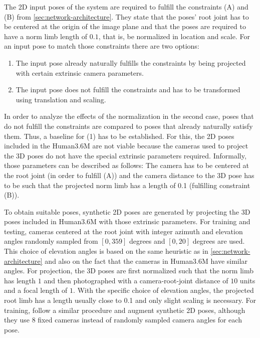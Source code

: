 The 2D input poses of the system are required to fulfill the constraints (A) and (B) from \autoref{sec:network-architecture}. 
They state that the poses' root joint has to be centered at the origin of the image plane and that the poses are required to have a norm limb length of $0.1$, that is, be normalized in location and scale.
For an input pose to match those constraints there are two options:
\begin{enumerate}
	\item The input pose already naturally fulfills the constraints by being projected with certain extrinsic camera parameters.
	\item The input pose does not fulfill the constraints and has to be transformed using translation and scaling.
\end{enumerate}
In order to analyze the effects of the normalization in the second case, poses that do not fulfill the constraints are compared to poses that already naturally satisfy them.
Thus, a baseline for (1) has to be established.
For this, the 2D poses included in the Human3.6M are not viable because the cameras used to project the 3D poses do not have the special extrinsic parameters required.
Informally, those parameters can be described as follows:
The camera has to be centered at the root joint (in order to fulfill (A)) and the camera distance to the 3D pose has to be such that the projected norm limb has a length of 0.1 (fulfilling constraint (B)).

To obtain suitable poses, synthetic 2D poses are generated by projecting the 3D poses included in Human3.6M with those extrinsic parameters.
For training and testing, cameras centered at the root joint with integer azimuth and elevation angles randomly sampled from $[0, 359]$ degrees and $[0, 20]$ degrees are used.
This choice of elevation angles is based on the same heuristic as in \autoref{sec:network-architecture} and also on the fact that the cameras in Human3.6M have similar angles.
For projection, the 3D poses are first normalized such that the norm limb has length $1$ and then photographed with a camera-root-joint distance of $10$ units and a focal length of $1$.
With the specific choice of elevation angles, the projected root limb has a length usually close to 0.1 and only slight scaling is necessary.
For training, \citet{drover18} follow a similar procedure and augment synthetic 2D poses, although they use 8 fixed cameras instead of randomly sampled camera angles for each pose.





